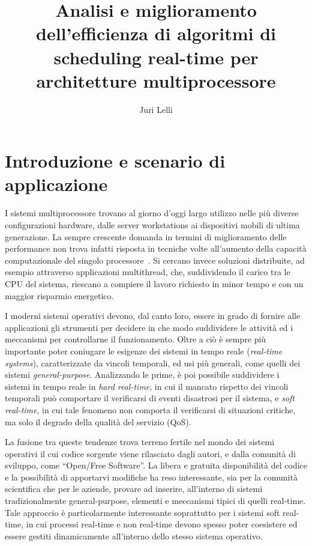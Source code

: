 \documentclass[a4paper, 11pt, oneside]{article}
\title{Analisi e miglioramento dell'efficienza di algoritmi di scheduling
real-time per architetture multiprocessore}
\author{Juri Lelli}
\begin{document}
\maketitle

\section*{Introduzione e scenario di applicazione}
I sistemi multiprocessore trovano al giorno d'oggi largo utilizzo nelle più
diverse configurazioni hardware, dalle server workstations ai dispositivi
mobili di ultima generazione. La sempre crescente domanda in termini di
miglioramento delle performance non trova infatti risposta in tecniche
volte all'aumento della capacità computazionale del singolo
processore~\cite{ARM}. Si
cercano invece soluzioni distribuite, ad esempio attraverso applicazioni
multithread, che, suddividendo il carico tra le CPU del sistema, riescano a
compiere il lavoro richiesto in minor tempo e con un maggior risparmio
energetico. 

I moderni sistemi operativi devono, dal canto loro, essere in grado di fornire
alle applicazioni gli strumenti per decidere in che modo suddividere le
attività ed i meccanismi per controllarne il funzionamento. Oltre a ciò è sempre
più importante poter coniugare le esigenze dei sistemi in tempo reale
(\emph{real-time systems}), caratterizzate da vincoli temporali, ed usi più generali,
come quelli dei sistemi \emph{general-purpose}. Analizzando le prime, è poi
possibile suddividere i sistemi in tempo reale in \emph{hard
real-time}, in cui il mancato rispetto dei vincoli temporali può comportare
il verificarsi di
eventi disastrosi per il sistema, e \emph{soft real-time}, in cui tale fenomeno
non comporta il verificarsi di situazioni critiche, ma solo il degrado della
qualità del servizio (QoS).

La fusione tra queste tendenze trova terreno fertile nel mondo dei sistemi
operativi il cui codice sorgente viene rilasciato dagli autori, e dalla
comunità di sviluppo, come ``Open/Free Software''. La libera e gratuita
disponibilità del codice e la possibilità di apportarvi modifiche ha reso
interessante, sia per la comunità scientifica che per le aziende, provare
ad inserire, all'interno di sistemi tradizionalmente general-purpose, elementi
e meccanismi tipici di quelli real-time. Tale approccio è particolarmente
interessante soprattutto per i sistemi soft real-time, in cui processi
real-time e non real-time devono spesso poter coesistere ed essere
gestiti dinamicamente all'interno dello stesso sistema operativo.
\end{document}
